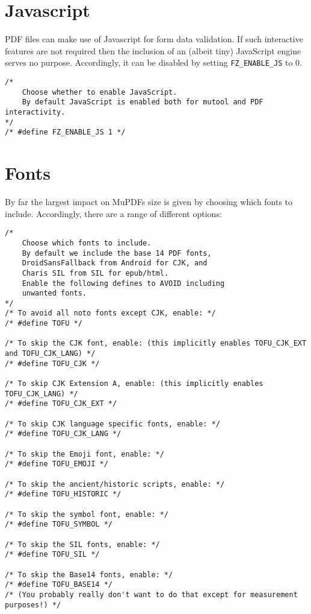 \documentclass[oneside]{book}
\begin{document}
\section{Javascript}

PDF files can make use of Javascript for form data validation. If such interactive features are not required then the inclusion of an (albeit tiny) JavaScript engine serves no purpose. Accordingly, it can be disabled by setting \texttt{FZ\_ENABLE\_JS} to 0.

\begin{lstlisting}
/*
	Choose whether to enable JavaScript.
	By default JavaScript is enabled both for mutool and PDF interactivity.
*/
/* #define FZ_ENABLE_JS 1 */
\end{lstlisting}

\section{Fonts}

By far the largest impact on MuPDFs size is given by choosing which fonts to include. Accordingly, there are a range of different options:

\begin{lstlisting}
/*
	Choose which fonts to include.
	By default we include the base 14 PDF fonts,
	DroidSansFallback from Android for CJK, and
	Charis SIL from SIL for epub/html.
	Enable the following defines to AVOID including
	unwanted fonts.
*/
/* To avoid all noto fonts except CJK, enable: */
/* #define TOFU */

/* To skip the CJK font, enable: (this implicitly enables TOFU_CJK_EXT and TOFU_CJK_LANG) */
/* #define TOFU_CJK */

/* To skip CJK Extension A, enable: (this implicitly enables TOFU_CJK_LANG) */
/* #define TOFU_CJK_EXT */

/* To skip CJK language specific fonts, enable: */
/* #define TOFU_CJK_LANG */

/* To skip the Emoji font, enable: */
/* #define TOFU_EMOJI */

/* To skip the ancient/historic scripts, enable: */
/* #define TOFU_HISTORIC */

/* To skip the symbol font, enable: */
/* #define TOFU_SYMBOL */

/* To skip the SIL fonts, enable: */
/* #define TOFU_SIL */

/* To skip the Base14 fonts, enable: */
/* #define TOFU_BASE14 */
/* (You probably really don't want to do that except for measurement purposes!) */
\end{lstlisting}
\end{document}
